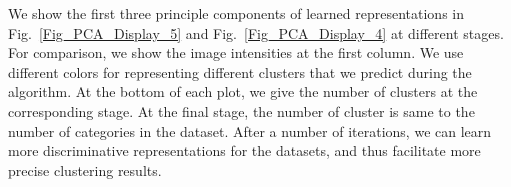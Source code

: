 \documentclass[10pt,twocolumn,letterpaper]{article}
\begin{document}
We show the first three principle components of learned representations in Fig.~\ref{Fig_PCA_Display_5} and Fig.~\ref{Fig_PCA_Display_4} at different stages. For comparison, we show the image intensities at the first column. We use different colors for representing different clusters that we predict during the algorithm. At the bottom of each plot, we give the number of clusters at the corresponding stage. At the final stage, the number of cluster is same to the number of categories in the dataset. After a number of iterations, we can learn more discriminative representations for the datasets, and thus facilitate more precise clustering results.
\end{document}
